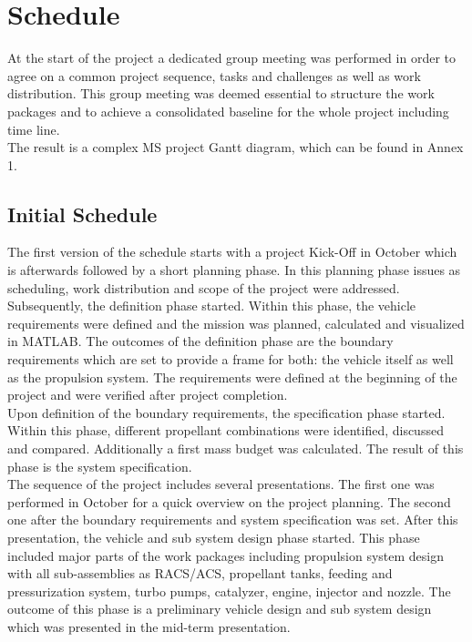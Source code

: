 \chapter{Schedule}

\qquad At the start of the project a dedicated group meeting was performed in order to agree on a common project sequence, tasks and challenges as well as work distribution. This group meeting was deemed essential to structure the work packages and to achieve a consolidated baseline for the whole project including time line.\\

The result is a complex MS project Gantt diagram, which can be found in Annex 1.\\
\section{Initial Schedule}
\qquad The first version of the schedule starts with a project Kick-Off in October which is afterwards followed by a short planning phase. In this planning phase issues as scheduling, work distribution and scope of the project were addressed.\\

Subsequently, the definition phase started. Within this phase, the vehicle requirements were defined and the mission was planned, calculated and visualized in MATLAB. The outcomes of the definition phase are the boundary requirements which are set to provide a frame for both: the vehicle itself as well as the propulsion system. The requirements were defined at the beginning of the project and were verified after project completion.\\

Upon definition of the boundary requirements, the specification phase started. Within this phase, different propellant combinations were identified, discussed and compared. Additionally a first mass budget was calculated. The result of this phase is the system specification.\\

The sequence of the project includes several presentations. The first one was performed in October for a quick overview on the project planning. The second one after the boundary requirements and system specification was set. 
After this presentation, the vehicle and sub system design phase started. This phase included major parts of the work packages including propulsion system design with all sub-assemblies as RACS/ACS, propellant tanks, feeding and pressurization system, turbo pumps, catalyzer, engine, injector and nozzle. The outcome of this phase is a preliminary vehicle design and sub system design which was presented in the mid-term presentation.\\

